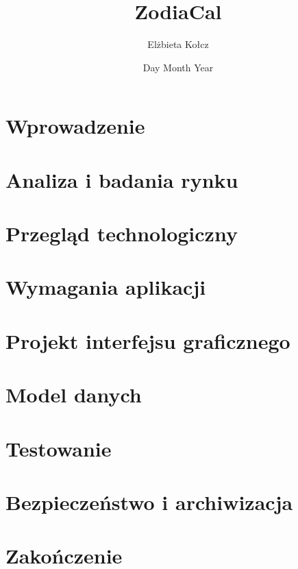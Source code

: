 \documentclass[12pt]{report}
\title{ZodiaCal}
\author{Elżbieta Kołcz}
\date{Day Month Year}
\begin{document}

\tableofcontents

\chapter{Wprowadzenie}


\chapter{Analiza i badania rynku}


\chapter{Przegląd technologiczny}


\chapter{Wymagania aplikacji}


\chapter{Projekt interfejsu graficznego}


\chapter{Model danych}


\chapter{Testowanie}


\chapter{Bezpieczeństwo i archiwizacja}


\chapter{Zakończenie}


\listoffigures
\listoftables

\printbibliography[heading=bibintoc, title={Bibliografia}]
\end{document}
